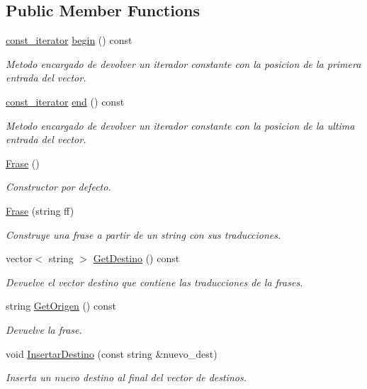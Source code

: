 \subsection*{Public Member Functions}
\begin{DoxyCompactItemize}
\item 
\hyperlink{class_frase_1_1const__iterator}{const\+\_\+iterator} \hyperlink{class_frase_a700666d5980f370b8c646f7d5e71de1c}{begin} () const 
\begin{DoxyCompactList}\small\item\em Metodo encargado de devolver un iterador constante con la posicion de la primera entrada del vector. \end{DoxyCompactList}\item 
\hyperlink{class_frase_1_1const__iterator}{const\+\_\+iterator} \hyperlink{class_frase_afc004f077e8bca4f76b4c7caca4c2641}{end} () const 
\begin{DoxyCompactList}\small\item\em Metodo encargado de devolver un iterador constante con la posicion de la ultima entrada del vector. \end{DoxyCompactList}\item 
\hyperlink{class_frase_a6af6ccf07cac65950917bc81f5e03c95}{Frase} ()\hypertarget{class_frase_a6af6ccf07cac65950917bc81f5e03c95}{}\label{class_frase_a6af6ccf07cac65950917bc81f5e03c95}

\begin{DoxyCompactList}\small\item\em Constructor por defecto. \end{DoxyCompactList}\item 
\hyperlink{class_frase_afec194c2d5d169d5e9a22333a595188b}{Frase} (string ff)
\begin{DoxyCompactList}\small\item\em Construye una frase a partir de un string con sus traducciones. \end{DoxyCompactList}\item 
vector$<$ string $>$ \hyperlink{class_frase_a8e402ede6cd22f97aa3b76678ae87805}{Get\+Destino} () const 
\begin{DoxyCompactList}\small\item\em Devuelve el vector destino que contiene las traducciones de la frases. \end{DoxyCompactList}\item 
string \hyperlink{class_frase_a57a41696b44dbe4941957225fcc6e789}{Get\+Origen} () const 
\begin{DoxyCompactList}\small\item\em Devuelve la frase. \end{DoxyCompactList}\item 
void \hyperlink{class_frase_a3581733d29ed02b57904543fc0385833}{Insertar\+Destino} (const string \&nuevo\+\_\+dest)\hypertarget{class_frase_a3581733d29ed02b57904543fc0385833}{}\label{class_frase_a3581733d29ed02b57904543fc0385833}

\begin{DoxyCompactList}\small\item\em Inserta un nuevo destino al final del vector de destinos. \end{DoxyCompactList}\end{DoxyCompactItemize}

